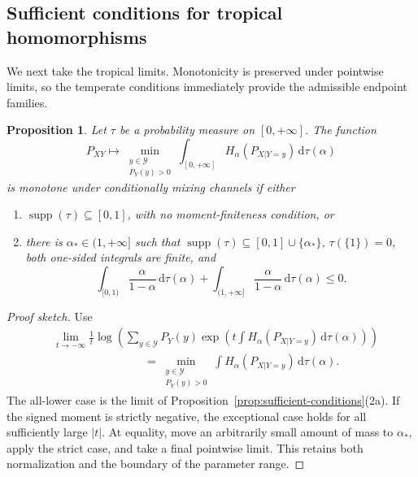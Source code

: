 \documentclass[aps,pra,11pt,onecolumn,nofootinbib,tightenlines]{revtex4-2}
\newtheorem{proposition}[theorem]{Proposition}
\theoremstyle{definition}
\newcommand{\Y}{\mathcal{Y}}
\def\d{\mathrm{d}}
\begin{document}
\subsection{Sufficient conditions for tropical homomorphisms}

We next take the tropical limits.  Monotonicity is preserved under pointwise
limits, so the temperate conditions immediately provide the admissible endpoint
families.

\begin{proposition}
\label{prop:sufficient-tropical}
Let $\tau$ be a probability measure on $[0,+\infty]$.  The function
\begin{equation}
\label{eq:TropicalForm}
P_{XY}\longmapsto
\min_{\substack{y\in\Y\\P_Y(y)>0}}
\int_{[0,+\infty]}H_\alpha(P_{X|Y=y})\,\d\tau(\alpha)
\end{equation}
is monotone under conditionally mixing channels if either
\begin{enumerate}[label=(\alph*)]
\item $\operatorname{supp}(\tau)\subseteq[0,1]$, with no moment-finiteness
condition, or
\item there is $\alpha_*\in(1,+\infty]$ such that
$\operatorname{supp}(\tau)\subseteq[0,1]\cup\{\alpha_*\}$,
$\tau(\{1\})=0$, both one-sided integrals are finite, and
\begin{equation}
\int_{[0,1)}\frac{\alpha}{1-\alpha}\,\d\tau(\alpha)
+\int_{(1,+\infty]}\frac{\alpha}{1-\alpha}\,\d\tau(\alpha)\leq0.
\end{equation}
\end{enumerate}
\end{proposition}

\begin{proof}[Proof sketch]
Use
\begin{align}
\label{eq:limit-tropical}
&\lim_{t\to-\infty}\frac1t\log\!\left(
\sum_{y\in\Y}P_Y(y)
\exp\!\left(t\int H_\alpha(P_{X|Y=y})\,\d\tau(\alpha)\right)
\right)\\
&\hspace{8em}=
\min_{\substack{y\in\Y\\P_Y(y)>0}}
\int H_\alpha(P_{X|Y=y})\,\d\tau(\alpha).
\end{align}
The all-lower case is the limit of Proposition~\ref{prop:sufficient-conditions}(2a).
If the signed moment is strictly negative, the exceptional case holds for all
sufficiently large $|t|$.  At equality, move an arbitrarily small amount of mass
to $\alpha_*$, apply the strict case, and take a final pointwise limit.  This
retains both normalization and the boundary of the parameter range.
\end{proof}
\end{document}
